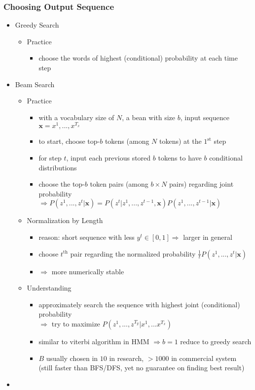 \subsubsection{Choosing Output Sequence}
\begin{itemize}
\item Greedy Search
	\begin{itemize}
	\item Practice
		\begin{itemize}
		\item choose the words of highest (conditional) probability at each time step
		\end{itemize}
	\end{itemize}
\item Beam Search
	\begin{itemize}
	\item Practice
		\begin{itemize}
		\item with a vocabulary size of $N$, a bean with size $b$, input sequence $\mathbf x = x^1,...,x^{T_x}$
		\item to start, choose top-$b$ tokens (among $N$ tokens) at the $1^\text{st}$ step
		\item for step $t$, input each previous stored $b$ tokens to have $b$ conditional distributions
		\item choose the top-$b$ token pairs (among $b\times N$ pairs) regarding joint probability \\
		$\Rightarrow P(z^1,...,z^t|\mathbf x) = P(z^t|z^1,...,z^{t-1},\mathbf x)P(z^1, ..., z^{t-1}|\mathbf x)$ 
		\end{itemize}
	\item Normalization by Length
		\begin{itemize}
		\item reason: short sequence with less $y^t\in[0,1] \Rightarrow$ larger in general
		\item choose $t^\text{th}$ pair regarding the normalized probability $\frac 1 t P(z^1,...,z^t|\mathbf x)$
		\item $\Rightarrow$ more numerically stable
		\end{itemize}
	\item Understanding
		\begin{itemize}
		\item approximately search the sequence with highest joint (conditional) probability \\
		$\Rightarrow$ try to maximize $P(z^1,...,z^{T_y}|x^1,...x^{T_x})$
		\item similar to viterbi algorithm in HMM $\Rightarrow b = 1$ reduce to greedy search
		\item $B$ usually chosen in $10$ in research, $>1000$ in commercial system \\
		(still faster than BFS/DFS, yet no guarantee on finding best result)
		\end{itemize}
	\end{itemize}
\item 
\end{itemize}

